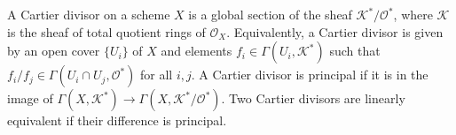 A Cartier divisor on a scheme $X$ is a global section of the sheaf $\mathcal{K}^*/\mathcal{O}^*$, where $\mathcal{K}$ is the sheaf of total quotient rings of $\mathcal{O}_X$. Equivalently, a Cartier divisor is given by an open cover $\{U_i\}$ of $X$ and elements $f_i \in \Gamma(U_i, \mathcal{K}^*)$ such that $f_i/f_j \in \Gamma(U_i \cap U_j, \mathcal{O}^*)$ for all $i,j$. A Cartier divisor is principal if it is in the image of $\Gamma(X, \mathcal{K}^*) \to \Gamma(X, \mathcal{K}^*/\mathcal{O}^*)$. Two Cartier divisors are linearly equivalent if their difference is principal.
